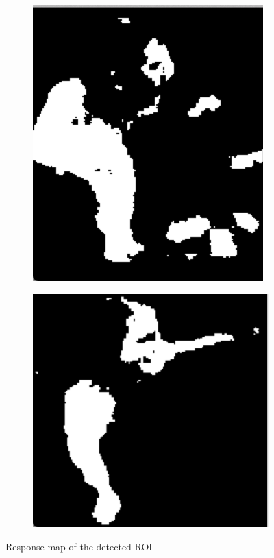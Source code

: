 \begin{figure}[H]
        \centering
        \begin{subfigure}[b]{0.3\textwidth}
        	\centering
				\includegraphics[scale=0.5]{Images/roi_response1.png}
        \end{subfigure}%
        \begin{subfigure}[b]{0.3\textwidth}
        	\centering
				\includegraphics[scale=0.5]{Images/roi_response2.png}
        \end{subfigure}
        \label{fig:responsemap}
        \caption{Response map of the  detected ROI}
\end{figure}

